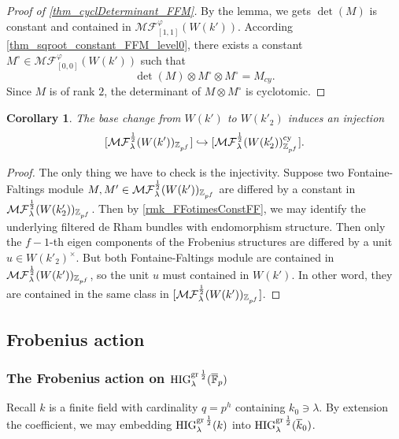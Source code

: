 \documentclass[12pt,twoside]{book}
\theoremstyle{plain}
\newtheorem{corollary}[corollary]{Corollary}
\theoremstyle{definition}
\theoremstyle{remark}
\newcommand{\bZ}{{\mathbb Z}}
\newcommand{\MF}{\mathcal{MF}}
\numberwithin{equation}{section}
\def\High{{\mathrm{HIG}^{{\rm gr}\,{1\over 2}}_{\lambda}}}
\def\MFh{\MF^{{1\over 2}}_{\lambda}}
\def\bark{{\overline k}_0}
\def\barFp{{\overline{\mathbb F}_p}}
\begin{document}
\begin{proof}[Proof of \autoref{thm_cyclDeterminant_FFM}]
By the lemma, we gets $\det(M)$ is constant and contained in $\MF^{\varphi}_{[1,1]}(W(k'))$. According \autoref{thm_sqroot_constant_FFM_level0}, there exists a constant $M^\circ\in\MF^{\varphi}_{[0,0]}(W(k'))$ such that
\[\det(M)\otimes M^\circ\otimes M^\circ = M_{cy}.\]
Since $M$ is of rank $2$, the determinant of $M\otimes M^\circ$ is cyclotomic.
\end{proof}

\begin{corollary} \label{thm_cyclDeterminant_FFM}
The base change from $W(k')$ to $W(k'_2)$ induces an injection
\[[\MFh(W(k'))_{\bZ_{p^f}}] \hookrightarrow [\MFh(W(k'_2))_{\bZ_{p^f}}^{\rm cy}].\]
\end{corollary}
\begin{proof}
The only thing we have to check is the injectivity. Suppose two Fontaine-Faltings module $M,M'\in \MFh(W(k'))_{\bZ_{p^f}}$ are differed by a constant in $\MFh(W(k'_2))_{\bZ_{p^f}}$. Then by \autoref{rmk_FFotimesConstFF}, we may identify the underlying filtered de Rham bundles with endomorphism structure. Then only the $f-1$-th eigen components of the Frobenius structures are differed by a unit $u\in W(k'_2)^\times$. But both Fontaine-Faltings module are contained in $\MFh(W(k'))_{\bZ_{p^f}}$, so the unit $u$ must contained in $W(k')$. In other word, they are contained in the same class in $[\MFh(W(k'))_{\bZ_{p^f}}]$.
\end{proof}

\newpage
\subsection{Frobenius action}
\subsubsection{The Frobenius action on $\High(\barFp)$} \label{sec_FrobActionHiggs}

Recall $k$ is a finite field with cardinality $q=p^h$ containing $k_0\ni \lambda$. By extension the coefficient, we may embedding $\High(k)$ into $\High(\bark)$.
\end{document}
